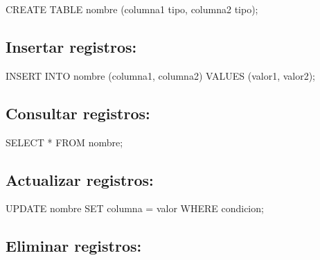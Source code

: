 \documentclass[
  a4paper,
  onepage,
  openany]{scrreprt}
\newenvironment{Shaded}{\begin{snugshade}}{\end{snugshade}}
\newcommand{\KeywordTok}[1]{\textcolor[rgb]{0.00,0.23,0.31}{#1}}
\newcommand{\NormalTok}[1]{\textcolor[rgb]{0.00,0.23,0.31}{#1}}
\newcommand{\OperatorTok}[1]{\textcolor[rgb]{0.37,0.37,0.37}{#1}}
\begin{document}
\begin{Shaded}
\begin{Highlighting}[]
\KeywordTok{CREATE} \KeywordTok{TABLE}\NormalTok{ nombre (columna1 tipo, columna2 tipo);}
\end{Highlighting}
\end{Shaded}

\hypertarget{insertar-registros-4}{%
\subsection{Insertar registros:}\label{insertar-registros-4}}

\begin{Shaded}
\begin{Highlighting}[]
\KeywordTok{INSERT} \KeywordTok{INTO}\NormalTok{ nombre (columna1, columna2) }\KeywordTok{VALUES}\NormalTok{ (valor1, valor2);}
\end{Highlighting}
\end{Shaded}

\hypertarget{consultar-registros-4}{%
\subsection{Consultar registros:}\label{consultar-registros-4}}

\begin{Shaded}
\begin{Highlighting}[]
\KeywordTok{SELECT} \OperatorTok{*} \KeywordTok{FROM}\NormalTok{ nombre;}
\end{Highlighting}
\end{Shaded}

\hypertarget{actualizar-registros-4}{%
\subsection{Actualizar registros:}\label{actualizar-registros-4}}

\begin{Shaded}
\begin{Highlighting}[]
\KeywordTok{UPDATE}\NormalTok{ nombre }\KeywordTok{SET}\NormalTok{ columna }\OperatorTok{=}\NormalTok{ valor }\KeywordTok{WHERE}\NormalTok{ condicion;}
\end{Highlighting}
\end{Shaded}

\hypertarget{eliminar-registros-4}{%
\subsection{Eliminar registros:}\label{eliminar-registros-4}}
\end{document}
